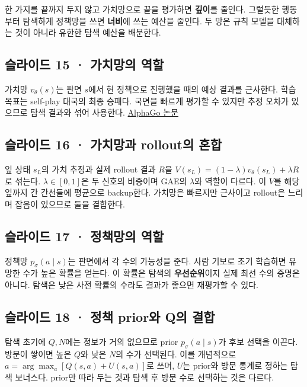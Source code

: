 \documentclass[11pt,a4paper]{article}
\begin{document}
한 가지를 끝까지 두지 않고 가치망으로 끝을 평가하면 \textbf{깊이}를 줄인다. 그럴듯한 행동부터 탐색하게 정책망을 쓰면 \textbf{너비}에 쓰는 예산을 줄인다. 두 망은 규칙 모델을 대체하는 것이 아니라 유한한 탐색 예산을 배분한다.\par

\subsection{슬라이드 15 · 가치망의 역할}

가치망 $v_\theta(s)$는 판면 $s$에서 현 정책으로 진행했을 때의 예상 결과를 근사한다. 학습 목표는 self-play 대국의 최종 승패다. 국면을 빠르게 평가할 수 있지만 추정 오차가 있으므로 탐색 결과와 섞어 사용한다. \href{https://www.nature.com/articles/nature16961}{AlphaGo 논문}\par

\subsection{슬라이드 16 · 가치망과 rollout의 혼합}

잎 상태 $s_L$의 가치 추정과 실제 rollout 결과 $R$을 $V(s_L)=(1-\lambda)v_\theta(s_L)+\lambda R$로 섞는다. $\lambda\in[0,1]$은 두 신호의 비중이며 GAE의 $\lambda$와 역할이 다르다. 이 $V$를 해당 잎까지 간 간선들에 평균으로 backup한다. 가치망은 빠르지만 근사이고 rollout은 느리며 잡음이 있으므로 둘을 결합한다.\par

\subsection{슬라이드 17 · 정책망의 역할}

정책망 $p_\sigma(a\mid s)$는 판면에서 각 수의 가능성을 준다. 사람 기보로 초기 학습하면 유망한 수가 높은 확률을 얻는다. 이 확률은 탐색의 \textbf{우선순위}이지 실제 최선 수의 증명은 아니다. 탐색은 낮은 사전 확률의 수라도 결과가 좋으면 재평가할 수 있다.\par

\subsection{슬라이드 18 · 정책 prior와 Q의 결합}

탐색 초기에 $Q,N$에는 정보가 거의 없으므로 prior $p_\sigma(a\mid s)$가 후보 선택을 이끈다. 방문이 쌓이면 높은 $Q$와 낮은 $N$의 수가 선택된다. 이를 개념적으로 $a=\arg\max_a[Q(s,a)+U(s,a)]$로 쓰며, $U$는 prior와 방문 통계로 정하는 탐색 보너스다. prior만 따라 두는 것과 탐색 후 방문 수로 선택하는 것은 다르다.\par
\end{document}
